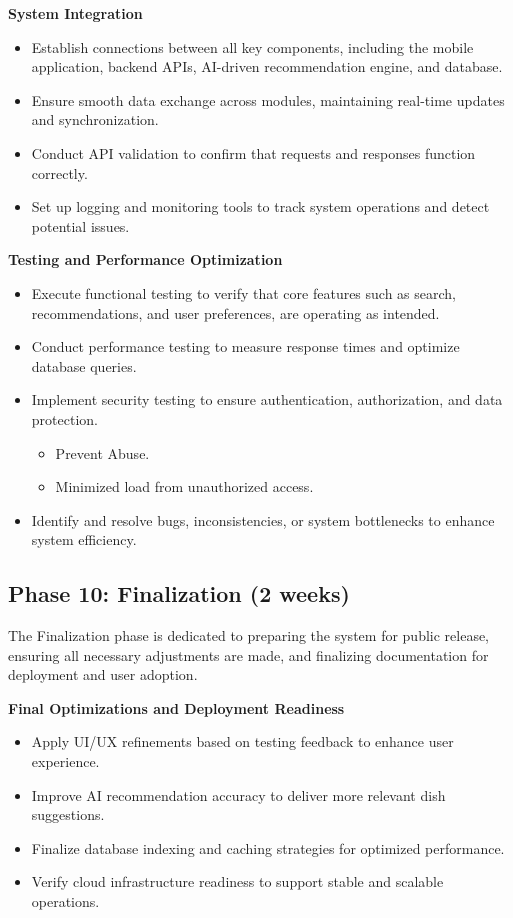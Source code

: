 \textbf{System Integration}
\begin{itemize}
\item Establish connections between all key components, including the mobile application, backend APIs, AI-driven recommendation engine, and database.
\item Ensure smooth data exchange across modules, maintaining real-time updates and synchronization.
\item Conduct API validation to confirm that requests and responses function correctly.
\item Set up logging and monitoring tools to track system operations and detect potential issues.
\end{itemize}

\textbf{Testing and Performance Optimization}
\begin{itemize}
\item Execute functional testing to verify that core features such as search, recommendations, and user preferences, are operating as intended.
\item Conduct performance testing to measure response times and optimize database queries.
\item Implement security testing to ensure authentication, authorization, and data protection.
	\begin{itemize}
	\item Prevent Abuse.
	\item Minimized load from unauthorized access.
	\end{itemize}
\item Identify and resolve bugs, inconsistencies, or system bottlenecks to enhance system efficiency.
\end{itemize}

\subsection*{Phase 10: Finalization (2 weeks)}
The Finalization phase is dedicated to preparing the system for public release, ensuring all necessary adjustments are made, and finalizing documentation for deployment and user adoption.

\textbf{Final Optimizations and Deployment Readiness}
\begin{itemize}
\item Apply UI/UX refinements based on testing feedback to enhance user experience.
\item Improve AI recommendation accuracy to deliver more relevant dish suggestions.
\item Finalize database indexing and caching strategies for optimized performance.
\item Verify cloud infrastructure readiness to support stable and scalable operations.
\end{itemize}

